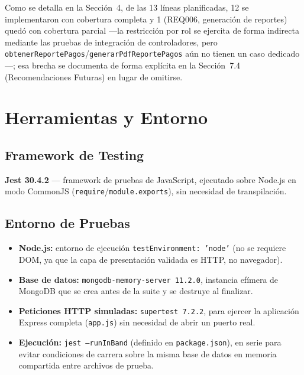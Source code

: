 \documentclass[12pt,a4paper]{article}
\begin{document}
Como se detalla en la Sección~4, de las 13 líneas planificadas, 12 se implementaron con
cobertura completa y 1 (REQ006, generación de reportes) quedó con cobertura parcial
—la restricción por rol se ejercita de forma indirecta mediante las pruebas de
integración de controladores, pero \texttt{obtenerReportePagos}/\texttt{generarPdfReportePagos}
aún no tienen un caso dedicado—; esa brecha se documenta de forma explícita en la
Sección~7.4 (Recomendaciones Futuras) en lugar de omitirse.
\clearpage

\section{Herramientas y Entorno}

\subsection{Framework de Testing}

\textbf{Jest 30.4.2} — framework de pruebas de JavaScript, ejecutado sobre Node.js en
modo CommonJS (\texttt{require}/\texttt{module.exports}), sin necesidad de transpilación.

\subsection{Entorno de Pruebas}

\begin{itemize}[nosep]
    \item \textbf{Node.js:} entorno de ejecución \texttt{testEnvironment: 'node'} (no se
    requiere DOM, ya que la capa de presentación validada es HTTP, no navegador).
    \item \textbf{Base de datos:} \texttt{mongodb-memory-server 11.2.0}, instancia efímera
    de MongoDB que se crea antes de la suite y se destruye al finalizar.
    \item \textbf{Peticiones HTTP simuladas:} \texttt{supertest 7.2.2}, para ejercer la
    aplicación Express completa (\texttt{app.js}) sin necesidad de abrir un puerto real.
    \item \textbf{Ejecución:} \texttt{jest --runInBand} (definido en
    \texttt{package.json}), en serie para evitar condiciones de carrera sobre la misma
    base de datos en memoria compartida entre archivos de prueba.
\end{itemize}
\end{document}
